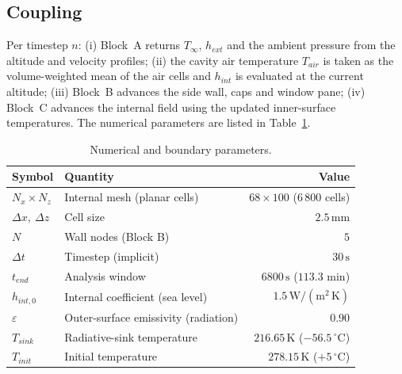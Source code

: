 \documentclass[11pt,a4paper]{article}
\newcommand{\degC}{\,^{\circ}\mathrm{C}}
\newcommand{\unit}[1]{\,\mathrm{#1}}
\begin{document}
\subsection{Coupling}
Per timestep $n$: (i) Block~A returns $T_\infty$, $h_{ext}$ and the ambient pressure
from the altitude and velocity profiles; (ii) the cavity air temperature $T_{air}$ is
taken as the volume-weighted mean of the air cells and $h_{int}$ is evaluated at the
current altitude; (iii) Block~B advances the side wall, caps and window pane; (iv)
Block~C advances the internal field using the updated inner-surface temperatures. The
numerical parameters are listed in Table~\ref{tab:num}.

\begin{table}[H]
\centering
\caption{Numerical and boundary parameters.}
\label{tab:num}
\begin{tabular}{llr}
\toprule
Symbol & Quantity & Value \\
\midrule
$N_x \times N_z$ & Internal mesh (planar cells)       & $68 \times 100$ (6\,800 cells) \\
$\Delta x,\ \Delta z$ & Cell size                     & $2.5\unit{mm}$ \\
$N$ & Wall nodes (Block B)                             & $5$ \\
$\Delta t$ & Timestep (implicit)                       & $30\unit{s}$ \\
$t_{end}$ & Analysis window                            & $6800\unit{s}$ ($113.3$ min) \\
$h_{int,0}$ & Internal coefficient (sea level)         & $1.5\unit{W/(m^2\,K)}$ \\
$\varepsilon$ & Outer-surface emissivity (radiation)    & $0.90$ \\
$T_{sink}$ & Radiative-sink temperature                & $216.65\unit{K}$ ($-56.5\degC$) \\
$T_{init}$ & Initial temperature                       & $278.15\unit{K}$ ($+5\degC$) \\
\bottomrule
\end{tabular}
\end{table}

\end{document}
